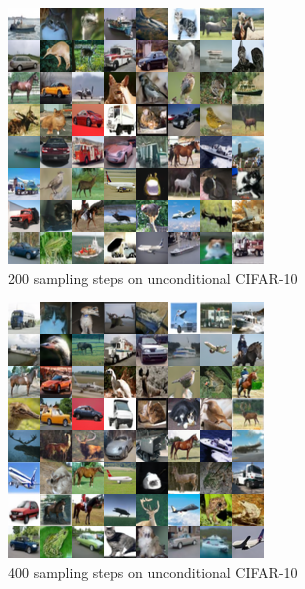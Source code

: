 \documentclass{article}
\begin{document}
\begin{figure}[h!]
    \centerline{\includegraphics[width=0.78\columnwidth]{samples_cifar_hybrid_200.png}}
    \caption{200 sampling steps on unconditional CIFAR-10}
    \vskip -0.4in
\end{figure}
\newpage
\begin{figure}[h!]
    \centerline{\includegraphics[width=0.78\columnwidth]{samples_cifar_hybrid_400.png}}
    \caption{400 sampling steps on unconditional CIFAR-10}
\end{figure}
\end{document}
